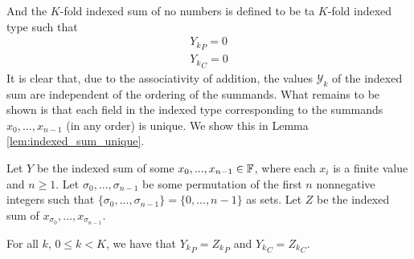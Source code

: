       And the $K$-fold indexed sum of no numbers is defined to be ta $K$-fold indexed type such that
      \begin{align}
        {Y_k}_P = 0\nonumber\\
        {Y_k}_C = 0
        \label{eq:indexed_sum_zero}
      \end{align}
      It is clear that, due to the associativity of addition, the values $\mathcal{Y}_k$ of the indexed sum are independent of the ordering of the summands. What remains to be shown is that each field in the indexed type corresponding to the summands $x_0, ..., x_{n - 1}$ (in any order) is unique. We show this in Lemma \ref{lem:indexed_sum_unique}.

      \begin{samepage}
      \begin{lem}
        Let $Y$ be the indexed sum of some $x_0, ..., x_{n - 1} \in \mathbb{F}$, where each $x_i$ is a finite value and $n \geq 1$.
        Let $\sigma_0, ..., \sigma_{n - 1}$ be some permutation of the first $n$ nonnegative integers such that $\{\sigma_0, ..., \sigma_{n - 1}\} = \{0, ..., n - 1\}$ as sets.
        Let $Z$ be the indexed sum of $x_{\sigma_0}, ..., x_{\sigma_{n - 1}}$.

        For all $k$, $0 \leq k < K$, we have that ${Y_k}_P = {Z_k}_P$ and ${Y_k}_C = {Z_k}_C$.
        \label{lem:indexed_sum_unique}
      \end{lem}
      \end{samepage}

